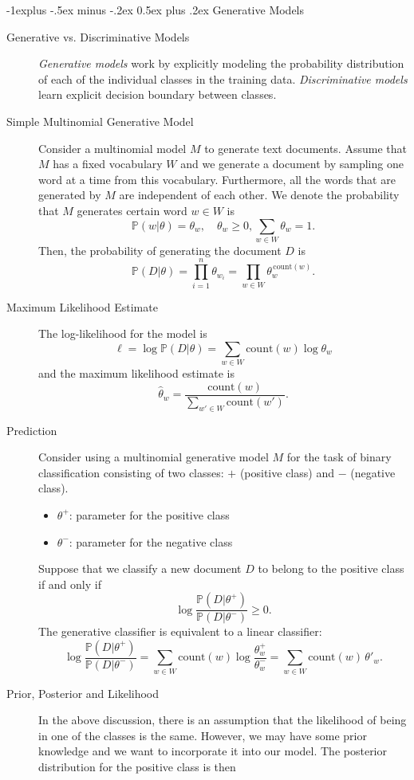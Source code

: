 \documentclass[10pt,landscape,a4paper]{article}
\makeatletter
\renewcommand{\subsection}{\@startsection{subsection}{2}{0mm}%
                                {-1explus -.5ex minus -.2ex}%
                                {0.5ex plus .2ex}%
                                {\normalfont\normalsize\bfseries}}
\makeatother
\begin{document}
\begin{multicols*}{3}
\subsection{Generative Models}
\begin{description}
	\item[Generative vs. Discriminative Models] {\it Generative models} work by explicitly modeling the probability distribution of each of the individual classes in the training data. {\it Discriminative models} learn explicit decision boundary between classes.
	\item[Simple Multinomial Generative Model] Consider a multinomial model $M$ to generate text documents. Assume that $M$ has a fixed vocabulary $W$ and we generate a document by sampling one word at a time from this vocabulary. Furthermore, all the words that are generated by $M$ are independent of each other. We denote the probability that $M$ generates certain word $w\in W$ is
	$$\mathbb{P}\left(w|\theta\right)=\theta_w,\quad\theta_w\geq0,\sum_{w\in W}\theta_w=1.$$
	Then, the probability of generating the document $D$ is
	$$\mathbb{P}\left(D|\theta\right)=\prod_{i=1}^{n}\theta_{w_i}=\prod_{w\in W}\theta_w^{\,\text{count}(w)}.$$
	\item[Maximum Likelihood Estimate] The log-likelihood for the model is
	$$\ell=\log\mathbb{P}(D|\theta)=\sum_{w\in W}\text{count}(w)\log\theta_w$$
	and the maximum likelihood estimate is
	$$\widehat{\theta}_w=\dfrac{\text{count}(w)}{\sum\limits_{w'\in W}\text{count}(w')}.$$
	\item[Prediction] Consider using a multinomial generative model $M$ for the task of binary classification consisting of two classes: $+$ (positive class) and $-$ (negative class).
	\begin{itemize}
		\item $\theta^+$: parameter for the positive class
		\item $\theta^-$: parameter for the negative class
	\end{itemize}
	Suppose that we classify a new document $D$ to belong to the positive class if and only if
	$$\log\dfrac{\mathbb{P}(D|\theta^+)}{\mathbb{P}(D|\theta^-)}\geq0.$$
	The generative classifier is equivalent to a linear classifier:
	$$\log\dfrac{\mathbb{P}(D|\theta^+)}{\mathbb{P}(D|\theta^-)}=\sum_{w\in W}\text{count}(w)\log\dfrac{\theta_w^+}{\theta_w^-}=\sum_{w\in W}\text{count}(w)\,\theta'_w.$$
	\item[Prior, Posterior and Likelihood] In the above discussion, there is an assumption that the likelihood of being in one of the classes is the same. However, we may have some prior knowledge and we want to incorporate it into our model. The posterior distribution for the positive class is then

\end{description}
\end{multicols*}
\end{document}
